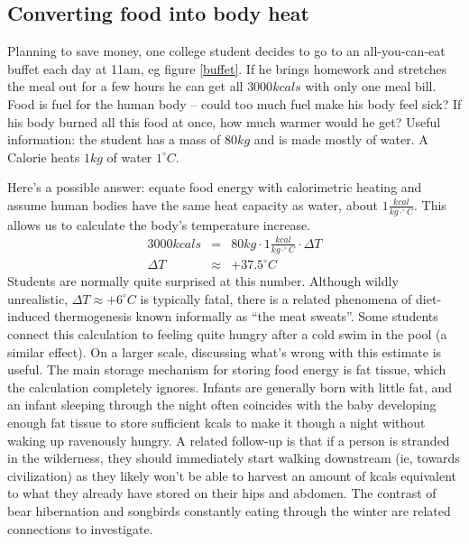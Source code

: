 \documentclass[12pt]{iopart}
\newcommand{\bea}{\begin{eqnarray}}
\newcommand{\eea}{\end{eqnarray}}
\newcommand{\degC}{^{\circ}C}
\begin{document}
\subsection{Converting food into body heat}
Planning to save money, one college student decides to go to an all-you-can-eat buffet each day at 11am, eg figure \ref{buffet}.  If he brings homework and stretches the meal out for a few hours he can get all $3000kcals$ with only one meal bill.  Food is fuel for the human body -- could too much fuel make his body feel sick? If his body burned all this food at once, how much warmer would he get? 
Useful information: the student has a mass of $80kg$ and is made mostly of water.  A Calorie heats $1 kg$ of water $1^{\circ}C$. 

Here's a possible answer:
equate food energy with calorimetric heating and assume human bodies have the same heat capacity as water, about $1\frac{kcal}{kg\cdot\degC}$. This allows us to calculate the body's temperature increase.
\bea
3000kcals &=& 80kg\cdot1 \frac{kcal}{kg\cdot \degC}\cdot\Delta T\\
\Delta T &\approx& +37.5\degC
\eea
Students are normally quite surprised at this number.  Although wildly unrealistic, $\Delta T \approx +6\degC$ is typically fatal, there is a related phenomena of diet-induced thermogenesis\cite{meat_sweats} known informally as ``the meat sweats''. Some students connect this calculation to feeling quite hungry after a cold swim in the pool (a similar effect).  On a larger scale, discussing what's wrong with this estimate is useful.  The main storage mechanism for storing food energy is fat tissue, which the calculation completely ignores.  Infants are generally born with little fat, and an infant sleeping through the night often coincides with the baby developing enough fat tissue to store sufficient kcals to make it though a night without waking up ravenously hungry.  A related follow-up is that if a person is stranded in the wilderness, they should immediately start walking downstream (ie, towards civilization) as they likely won't be able to harvest an amount of kcals equivalent to what they already have stored on their hips and abdomen.\cite{trout}  The contrast of bear hibernation \cite{fat_bear} and songbirds constantly eating through the winter are related connections to investigate.
\end{document}
